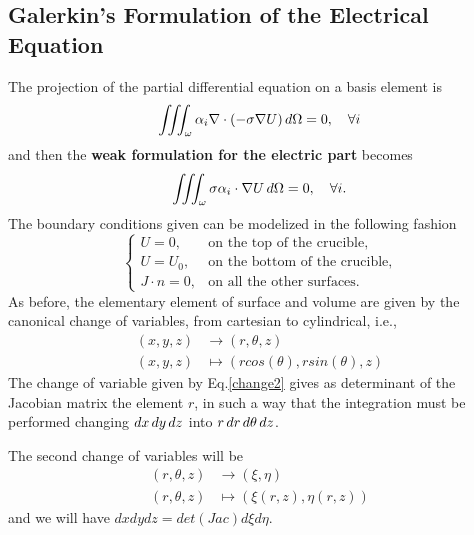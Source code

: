 \subsection{Galerkin’s Formulation of the Electrical Equation}
The projection of the partial differential equation on a basis element is
\[\iiint_{\omega} \alpha_i \nabla\cdot(-\sigma\nabla U)\mathop{}\!d\Omega=0, \quad \forall i \]
and then the \textbf{weak formulation for the electric part} becomes
\begin{equation}
\iiint_{\omega}\sigma\alpha_i\cdot\nabla U\mathop{}\!d \Omega=0,\quad \forall i.
\end{equation}
The boundary conditions given can be modelized in the following fashion
\[\begin{cases}
U = 0, &\text{on the top of the crucible,}\\
U = U_0, &\text{on the bottom of the crucible,}\\
J\cdot n=0, &\text{on all the other surfaces.}
\end{cases} \]
As before, the elementary element of surface and volume are given by the canonical change of variables, from cartesian to cylindrical, i.e., \begin{align}\label{change2}
(x,y,z)&\to(r,\theta,z)\\
(x,y,z)&\mapsto(rcos(\theta),rsin(\theta),z)\nonumber
\end{align}
The change of variable given by Eq.\ref{change2} gives as determinant of the Jacobian matrix the element $ r $, in such a way that the integration must be performed changing $ \mathop{}\!d x\mathop{}\!d y\mathop{}\!d z $ into $ r\mathop{}\!d r\mathop{}\!d\theta\mathop{}\!d z $.

The second change of variables will be 
\begin{align}\label{change3}
(r,\theta,z)&\to(\xi,\eta)\\
(r,\theta,z)&\mapsto(\xi(r,z),\eta(r,z))\nonumber
\end{align}
and we will have $ dxdydz=det(Jac)d\xi d\eta $.
